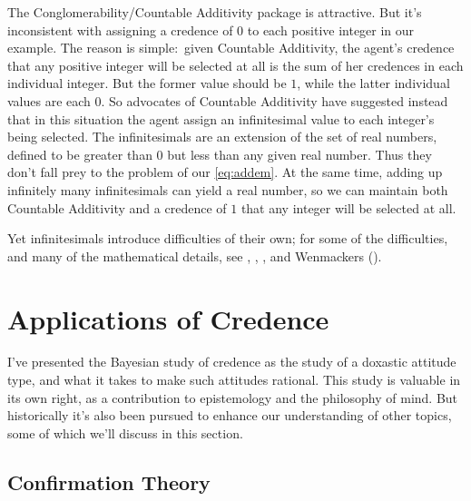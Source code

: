 The Conglomerability/Countable Additivity package is attractive. But it's inconsistent with assigning a credence of $0$ to each positive integer in our example. The reason is simple:\ given Countable Additivity, the agent's credence that any positive integer will be selected at all is the sum of her credences in each individual integer. But the former value should be $1$, while the latter individual values are each $0$. So advocates of Countable Additivity have suggested instead that in this situation the agent assign an infinitesimal value to each integer's being selected. The infinitesimals are an extension of the set of real numbers, defined to be greater than $0$ but less than any given real number. Thus they don't fall prey to the problem of our \autoref{eq:addem}. At the same time, adding up infinitely many infinitesimals can yield a real number, so we can maintain both Countable Additivity and a credence of $1$ that any integer will be selected at all.

Yet infinitesimals introduce difficulties of their own; for some of the difficulties, and many of the mathematical details, see \citet{WilliamsonInfinite}, \citet{EaswaranHyper}, \citet[Section 5]{HajekConditional}, and Wenmackers ().



\section{Applications of Credence}

I've presented the Bayesian study of credence as the study of a doxastic attitude type, and what it takes to make such attitudes rational.  This study is valuable in its own right, as a contribution to epistemology and the philosophy of mind. But historically it's also been pursued to enhance our understanding of other topics, some of which we'll discuss in this section. 

\subsection{Confirmation Theory} \label{ss:confirmation}

